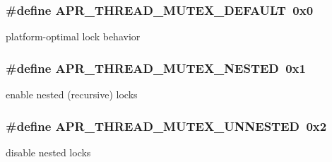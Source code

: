 \subsubsection[{\texorpdfstring{A\+P\+R\+\_\+\+T\+H\+R\+E\+A\+D\+\_\+\+M\+U\+T\+E\+X\+\_\+\+D\+E\+F\+A\+U\+LT}{APR_THREAD_MUTEX_DEFAULT}}]{\setlength{\rightskip}{0pt plus 5cm}\#define A\+P\+R\+\_\+\+T\+H\+R\+E\+A\+D\+\_\+\+M\+U\+T\+E\+X\+\_\+\+D\+E\+F\+A\+U\+LT~0x0}\hypertarget{group__apr__thread__mutex_ga579050872f9aff06e773b084264f7d06}{}\label{group__apr__thread__mutex_ga579050872f9aff06e773b084264f7d06}
platform-\/optimal lock behavior 
\subsubsection[{\texorpdfstring{A\+P\+R\+\_\+\+T\+H\+R\+E\+A\+D\+\_\+\+M\+U\+T\+E\+X\+\_\+\+N\+E\+S\+T\+ED}{APR_THREAD_MUTEX_NESTED}}]{\setlength{\rightskip}{0pt plus 5cm}\#define A\+P\+R\+\_\+\+T\+H\+R\+E\+A\+D\+\_\+\+M\+U\+T\+E\+X\+\_\+\+N\+E\+S\+T\+ED~0x1}\hypertarget{group__apr__thread__mutex_gaf421e0445dbc3c739130f5f6544c2e78}{}\label{group__apr__thread__mutex_gaf421e0445dbc3c739130f5f6544c2e78}
enable nested (recursive) locks 
\subsubsection[{\texorpdfstring{A\+P\+R\+\_\+\+T\+H\+R\+E\+A\+D\+\_\+\+M\+U\+T\+E\+X\+\_\+\+U\+N\+N\+E\+S\+T\+ED}{APR_THREAD_MUTEX_UNNESTED}}]{\setlength{\rightskip}{0pt plus 5cm}\#define A\+P\+R\+\_\+\+T\+H\+R\+E\+A\+D\+\_\+\+M\+U\+T\+E\+X\+\_\+\+U\+N\+N\+E\+S\+T\+ED~0x2}\hypertarget{group__apr__thread__mutex_gac31107f3db115edc0c26ea48943c6a16}{}\label{group__apr__thread__mutex_gac31107f3db115edc0c26ea48943c6a16}
disable nested locks 

